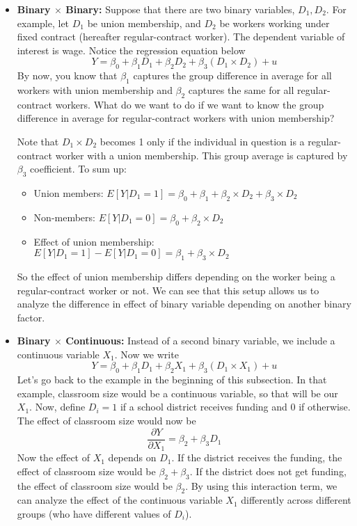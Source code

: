 \begin{itemize}
\item\textbf{Binary $\times$ Binary: } Suppose that there are two binary variables, $D_1, D_2$. For example, let $D_1$ be union membership, and $D_2$ be workers working under fixed contract (hereafter regular-contract worker). The dependent variable of interest is wage. Notice the regression equation below
\[
Y= \beta_0 + \beta_1 D_1 + \beta_2 D_2 + \beta_3 (D_1 \times D_2) + u
\]  
By now, you know that $\beta_1$ captures the group difference in average for all workers with union membership and $\beta_2$ captures the same for all regular-contract workers. What do we want to do if we want to know the group difference in average for regular-contract workers with union membership? \par 
Note that $D_1 \times D_2$ becomes 1 only if the individual in question is a regular-contract worker with a union membership. This group average is captured by $\beta_3$ coefficient. To sum up:
\begin{itemize}
\item Union members: $E[Y|D_1 = 1] = \beta_0+\beta_1+\beta_2\times D_2+\beta_3\times D_2$
\item Non-members:  $E[Y|D_1 = 0] = \beta_0+\beta_2\times D_2$
\item Effect of union membership: $E[Y|D_1 = 1]-E[Y|D_1 = 0] = \beta_1 + \beta_3\times D_2$
\end{itemize}
So the effect of union membership differs depending on the worker being a regular-contract worker or not. We can see that this setup allows us to analyze the difference in effect of binary variable depending on another binary factor. 
\item \textbf{Binary $\times$ Continuous: } Instead of a second binary variable, we include a continuous variable $X_1$. Now we write
\[
Y= \beta_0 + \beta_1 D_1 + \beta_2 X_1 + \beta_3 (D_1 \times X_1) + u
\]
Let's go back to the example in the beginning of this subsection. In that example, classroom size would be a continuous variable, so that will be our $X_1$. Now, define $D_i=1$ if a school district receives funding and $0$ if otherwise. The effect of classroom size would now be 
\[
\frac{\partial Y}{\partial X_1} = \beta_2 + \beta_3 D_1
\]
Now the effect of $X_1$ depends on $D_1$. If the district receives the funding, the effect of classroom size would be $\beta_2 + \beta_3$. If the district does not get funding, the effect of classroom size would be $\beta_2$. By using this interaction term, we can analyze the effect of the continuous variable $X_1$ differently across different groups (who have different values of $D_i$). 

\end{itemize}

